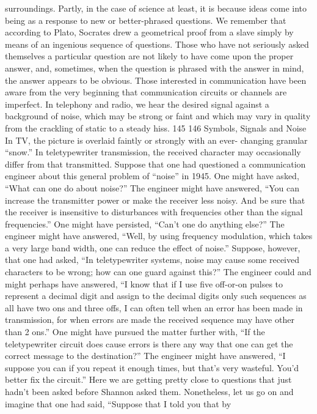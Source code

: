 {{{surroundings. Partly, in the case of science at least, it is because
ideas come into being as a response to new or better-phrased
questions. We remember that according to Plato, Socrates drew a
geometrical proof from a slave simply by means of an ingenious
sequence of questions. Those who have not seriously asked themselves
a particular question are not likely to have come upon the
proper answer, and, sometimes, when the question is phrased with
the answer in mind, the answer appears to be obvious.
Those interested in communication have been aware from the
very beginning that communication circuits or channels are imperfect.
In telephony and radio, we hear the desired signal against
a background of noise, which may be strong or faint and which
may vary in quality from the crackling of static to a steady hiss.
145
146
Symbols, Signals and Noise
In TV, the picture is overlaid faintly or strongly with an ever-
changing granular “snow.” In teletypewriter transmission, the
received character may occasionally differ from that transmitted.
Suppose that one had questioned a communication engineer
about this general problem of “noise” in 1945. One might have
asked, “What can one do about noise?” The engineer might have
answered, “You can increase the transmitter power or make the
receiver less noisy. And be sure that the receiver is insensitive to
disturbances with frequencies other than the signal frequencies.”
One might have persisted, “Can’t one do anything else?” The
engineer might have answered, “Well, by using frequency modulation,
which takes a very large band width, one can reduce the
effect of noise.”
Suppose, however, that one had asked, “In teletypewriter systems,
noise may cause some received characters to be wrong; how
can one guard against this?” The engineer could and might perhaps
have answered, “I know that if I use five off-or-on pulses to represent
a decimal digit and assign to the decimal digits only such
sequences as all have two ons and three offs, I can often tell when
an error has been made in transmission, for when errors are made
the received sequence may have other than 2 ons.”
One might have pursued the matter further with, “If the teletypewriter
circuit does cause errors is there any way that one can get
the correct message to the destination?” The engineer might have
answered, “I suppose you can if you repeat it enough times, but
that’s very wasteful. You’d better fix the circuit.”
Here we are getting pretty close to questions that just hadn’t
been asked before Shannon asked them. Nonetheless, let us go on
and imagine that one had said, “Suppose that I told you that by
}}}
